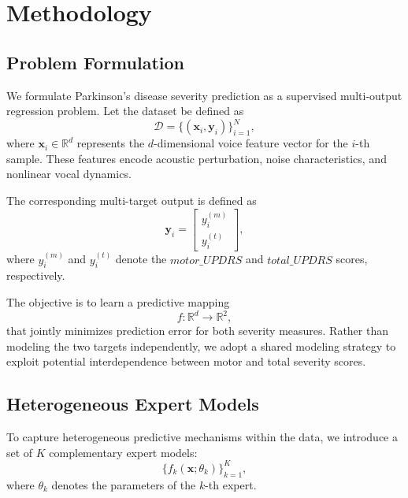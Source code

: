 \documentclass{customIEEEsingle}
\begin{document}
	\section{Methodology}\label{sec:methodology}
	
	\subsection{Problem Formulation}
	
	We formulate Parkinson’s disease severity prediction as a supervised multi-output regression problem. Let the dataset be defined as
	\begin{equation}
		\mathcal{D} = \{(\mathbf{x}_i, \mathbf{y}_i)\}_{i=1}^{N},
	\end{equation}
	where $\mathbf{x}_i \in \mathbb{R}^{d}$ represents the $d$-dimensional voice feature vector for the $i$-th sample. These features encode acoustic perturbation, noise characteristics, and nonlinear vocal dynamics.
	
	The corresponding multi-target output is defined as
	\begin{equation}
		\mathbf{y}_i =
		\begin{bmatrix}
			y_i^{(m)} \\
			y_i^{(t)}
		\end{bmatrix},
	\end{equation}
	where $y_i^{(m)}$ and $y_i^{(t)}$ denote the $motor\_UPDRS$ and $total\_UPDRS$ scores, respectively.
	
	The objective is to learn a predictive mapping
	\begin{equation}
		f: \mathbb{R}^{d} \rightarrow \mathbb{R}^{2},
	\end{equation}
	that jointly minimizes prediction error for both severity measures. Rather than modeling the two targets independently, we adopt a shared modeling strategy to exploit potential interdependence between motor and total severity scores.
	
	
	\subsection{Heterogeneous Expert Models}
	
	To capture heterogeneous predictive mechanisms within the data, we introduce a set of $K$ complementary expert models:
	\begin{equation}
		\{ f_k(\mathbf{x}; \theta_k) \}_{k=1}^{K},
	\end{equation}
	where $\theta_k$ denotes the parameters of the $k$-th expert.
	
\end{document}

